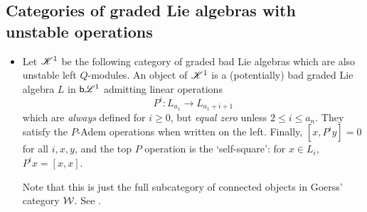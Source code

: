 \documentclass[11pt]{article}
\newcommand{\BadLie}[1]{\mathsf{b}{\scrL}^{#1}}%
\newcommand{\LL}[1]{{\scrK}^{#1}}%
\newcommand{\LambdaOp}{Q}
\newcommand{\Palgebra}{\calA(\calC)}
\begin{document}
\begin{CategoriesOfInterest}
\subsection*{Categories of graded Lie algebras with unstable operations}
\begin{itemize}
\setlength{\parindent}{.25in}
\item Let $\LL{1}$ be the following category of graded bad Lie algebras which are also unstable left $\LambdaOp$-modules.
An object of $\LL{1}$ is a (potentially) bad graded Lie algebra $L$ in $\BadLie{1}$ %
admitting linear operations
\[P^i:L_{a_1}\to L_{a_1+i+1}\]
which are \emph{always} defined for $i\geq0$, but \emph{equal zero} unless $2\leq i\leq a_n$. They satisfy the $P$-Adem operations when written on the left. Finally, $[x,P^iy]=0$ for all $i,x,y$, and the top $P$ operation is the `self-square': for $x\in L_{i}$, $P^{i}x=[x,x]$.

Note that this is just the full subcategory of connected objects in Goerss' category $\mathcal{W}$. See \cite[p.14]{MR1089001}.


\end{itemize}
\end{CategoriesOfInterest}
\end{document}
